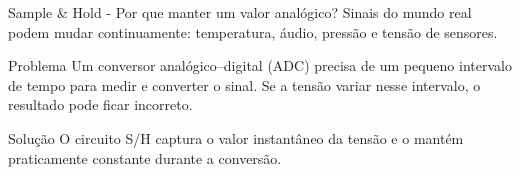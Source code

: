 \begin{frame}{Sample \& Hold - Por que manter um valor analógico?}
  Sinais do mundo real podem mudar continuamente: temperatura, áudio, pressão e tensão de sensores.

  \begin{block}{Problema}
    Um conversor analógico--digital (ADC) precisa de um pequeno intervalo de tempo para medir e converter o sinal. Se a tensão variar nesse intervalo, o resultado pode ficar incorreto.
  \end{block}

  \begin{alertblock}{Solução}
    O circuito S/H captura o valor instantâneo da tensão e o mantém praticamente constante durante a conversão.
  \end{alertblock}
\end{frame}